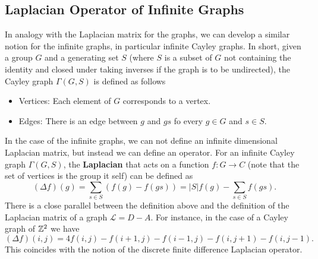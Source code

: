 \documentclass[10pt,a4paper,twocolumn]{article}
\begin{document}
	\subsection{Laplacian Operator of Infinite Graphs}
	In analogy with the Laplacian matrix for the graphs, we can develop a similar notion for the infinite graphs, in particular infinite Cayley graphs. In short, given a group $ G $ and a generating set $ S $ (where $ S $ is a subset of $ G $ not containing the identity and closed under taking inverses if the graph is to be undirected), the Cayley graph $ \Gamma(G,S) $ is defined as follows
	\begin{itemize}
		\item Vertices: Each element of $ G $ corresponds to a vertex.
		\item Edges: There is an edge between $ g $ and $ gs $ fo every $ g\in G $ and $ s \in S $.
	\end{itemize}
	In the case of the infinite graphs, we can not define an infinite dimensional Laplacian matrix, but instead we can define an operator. For an infinite Cayley graph $ \Gamma(G,S) $, the \textbf{Laplacian} that acts on a function $ f: G \to C $ (note that the set of vertices is the group it self) can be defined as
	\[ (\Delta f)(g) = \sum_{s\in S} (f(g) - f(gs)) = |S|f(g) - \sum_{s\in S} f(gs). \]
	There is a close parallel between the definition above and the definition of the Laplacian matrix of a graph $ \mathcal{L} = D - A $. For instance, in the case of a Cayley graph of $ \mathbb{Z}^2 $ we have
	\[ (\Delta f)(i,j) = 4 f(i,j) - f(i+1,j) - f(i-1,j) - f(i,j+1) - f(i,j-1). \]
	This coincides with the notion of the discrete finite difference Laplacian operator.
%	
	\clearpage
	\onecolumn
	
	
	\twocolumn
	
\end{document}
